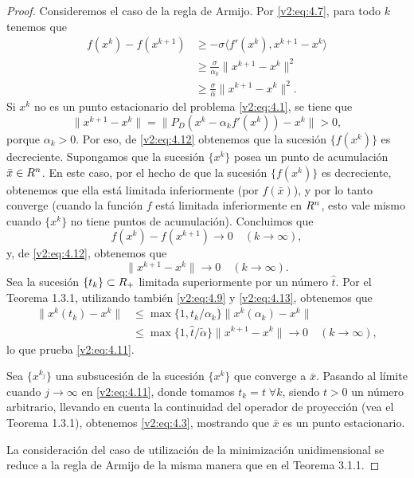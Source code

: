 \begin{proof}
    Consideremos el caso de la regla de Armijo. Por \eqref{v2:eq:4.7}, para todo $k$ tenemos que
    \begin{align}
        f(x^k) - f(x^{k+1}) &\ge -\sigma \langle f'(x^k), x^{k+1} - x^k \rangle \nonumber \\
        &\ge \frac{\sigma}{\alpha_k} \|x^{k+1} - x^k\|^2 \nonumber \\
        &\ge \frac{\sigma}{\hat{\alpha}} \|x^{k+1} - x^k\|^2.
        \label{v2:eq:4.12}
    \end{align}
    Si $x^k$ no es un punto estacionario del problema \eqref{v2:eq:4.1}, se tiene que
    \[
        \|x^{k+1} - x^k\| = \|P_D(x^k - \alpha_k f'(x^k)) - x^k\| > 0,
    \]
    porque $\alpha_k > 0$. Por eso, de \eqref{v2:eq:4.12} obtenemos que la sucesión $\{f(x^k)\}$ es decreciente. Supongamos que la sucesión $\{x^k\}$ posea un punto de acumulación $\bar{x} \in R^n$. En este caso, por el hecho de que la sucesión $\{f(x^k)\}$ es decreciente, obtenemos que ella está limitada inferiormente (por $f(\bar{x})$), y por lo tanto converge (cuando la función $f$ está limitada inferiormente en $R^n$, esto vale mismo cuando $\{x^k\}$ no tiene puntos de acumulación). Concluimos que
    \[
        f(x^k) - f(x^{k+1}) \to 0 \quad (k \to \infty),
    \]
    y, de \eqref{v2:eq:4.12}, obtenemos que
    \begin{equation}
        \|x^{k+1} - x^k\| \to 0 \quad (k \to \infty).
        \label{v2:eq:4.13}
    \end{equation}
    Sea la sucesión $\{t_k\} \subset R_+$ limitada superiormente por un número $\hat{t}$. Por el Teorema 1.3.1, utilizando también \eqref{v2:eq:4.9} y \eqref{v2:eq:4.13}, obtenemos que
    \begin{align*}
        \|x^k(t_k) - x^k\| &\le \max\{1, t_k/\alpha_k\} \|x^k(\alpha_k) - x^k\| \\
        &\le \max\{1, \hat{t}/\tilde{\alpha}\} \|x^{k+1} - x^k\| \to 0 \quad (k \to \infty),
    \end{align*}
    lo que prueba \eqref{v2:eq:4.11}.

    Sea $\{x^{k_j}\}$ una subsucesión de la sucesión $\{x^k\}$ que converge a $\bar{x}$. Pasando al límite cuando $j \to \infty$ en \eqref{v2:eq:4.11}, donde tomamos $t_k = t \; \forall k$, siendo $t > 0$ un número arbitrario, llevando en cuenta la continuidad del operador de proyección (vea el Teorema 1.3.1), obtenemos \eqref{v2:eq:4.3}, mostrando que $\bar{x}$ es un punto estacionario.

    La consideración del caso de utilización de la minimización unidimensional se reduce a la regla de Armijo de la misma manera que en el Teorema 3.1.1.
\end{proof}

